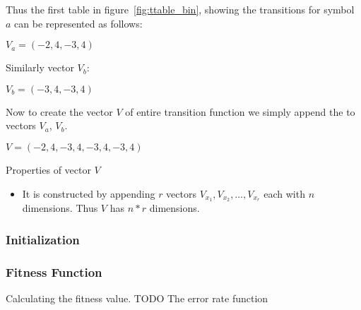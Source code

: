 \documentclass[runningheads,a4paper]{llncs}
\begin{document}
Thus the first table in figure~\ref{fig:ttable_bin}, showing the transitions for symbol $a$ can be represented as follows:

\begin{center}
	$V_a = (-2, 4, -3, 4)$
\end{center}

Similarly vector $V_b$:

\begin{center}
	$V_b = (-3, 4, -3, 4)$
\end{center}

Now to create the vector $V$ of entire transition function we simply append the to vectors $V_a$, $V_b$.

\begin{center}
	$V = (-2,4,-3,4,-3,4,-3,4)$
\end{center}

Properties of vector $V$
\begin{itemize}
	\item It is constructed by appending $r$ vectors $V_{x_1}, V_{x_2}, \ldots, V_{x_{r}}$ each with $n$ dimensions. Thus $V$ has $n * r$ dimensions.
	
\end{itemize}

\subsubsection{Initialization}

\subsubsection{Fitness Function}
Calculating the fitness value.
{\color{red} TODO The error rate function}

\end{document}

